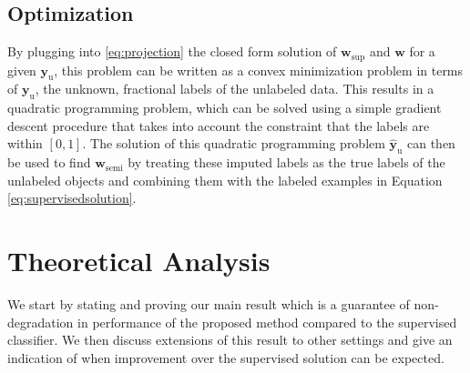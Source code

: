 \documentclass[sts,preprint]{imsart-custom}
\renewcommand{\vec}[1]{\mathbf{#1}}
\begin{document}
\subsection{Optimization}
By plugging into \eqref{eq:projection} the closed form solution of $\vec{w}_\text{sup}$ and $\vec{w}$  for a given $\vec{y}_\text{u}$, this problem can be written as a convex minimization problem in terms of $\vec{y}_\text{u}$, the unknown, fractional labels of the unlabeled data. This results in a quadratic programming problem, which can be solved using a simple gradient descent procedure that takes into account the constraint that the labels are within $[0,1]$. The solution of this quadratic programming problem $\vec{\hat{y}}_\text{u}$ can then be used to find  $\vec{w}_\text{semi}$ by treating these imputed labels as the true labels of the unlabeled objects and combining them with the labeled examples in Equation \eqref{eq:supervisedsolution}.

\section{Theoretical Analysis}
\label{section:theory}

We start by stating and proving our main result which is a guarantee of non-degradation in performance of the proposed method compared to the supervised classifier. We then discuss extensions of this result to other settings and give an indication of when improvement over the supervised solution can be expected.
\end{document}
